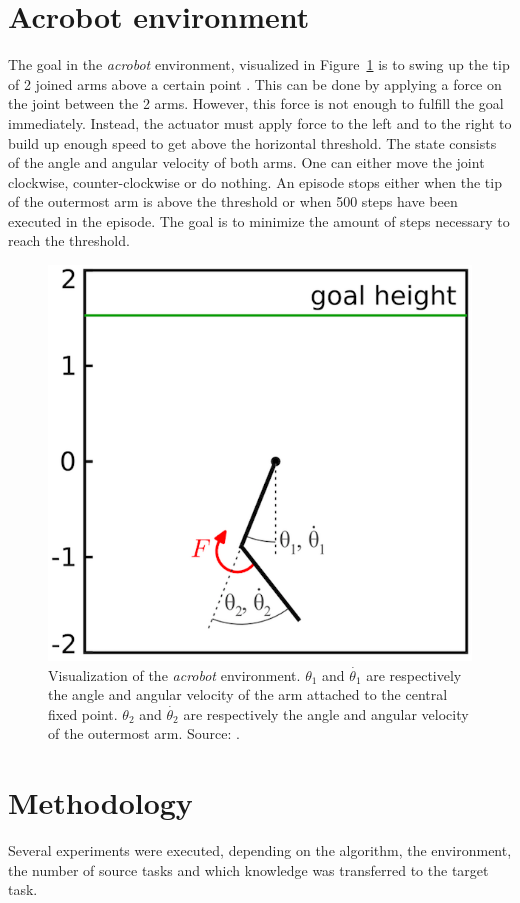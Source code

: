 \section{Acrobot environment} %
\label{sub:acrobot_environment}
The goal in the \textit{acrobot} environment, visualized in Figure~\ref{fig:acrobot} is to swing up the tip of 2 joined arms above a certain point \cite{spong1995swing}.
This can be done by applying a force on the joint between the 2 arms.
However, this force is not enough to fulfill the goal immediately. Instead, the actuator must apply force to the left and to the right to build up enough speed to get above the horizontal threshold.
The state consists of the angle and angular velocity of both arms. One can either move the joint clockwise, counter-clockwise or do nothing.
An episode stops either when the tip of the outermost arm is above the threshold or when 500 steps have been executed in the episode.
The goal is to minimize the amount of steps necessary to reach the threshold.
\begin{figure}[htb]
    \centering
    \includegraphics[width=.7\linewidth]{images/acrobot.png}
    \caption[Visualization of the \emph{acrobot} environment]{Visualization of the \emph{acrobot} environment. $\theta_1$ and $\dot{\theta_1}$ are respectively the angle and angular velocity of the arm attached to the central fixed point. $\theta_2$ and $\dot{\theta_2}$ are respectively the angle and angular velocity of the outermost arm. Source: \cite{fremaux2013reinforcement}.}
    \label{fig:acrobot}
\end{figure}

\section{Methodology} %
\label{sub:methodology}
Several experiments were executed, depending on the algorithm, the environment, the number of source tasks and which knowledge was transferred to the target task.\\

